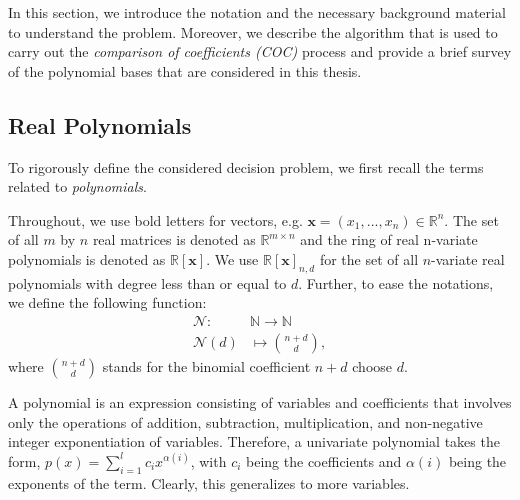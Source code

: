 \documentclass[12pt]{amsart}
\numberwithin{equation}{section}
\theoremstyle{definition}
\numberwithin{thm}{section}
\begin{document}
In this section, we introduce the notation and the necessary background material
to understand the problem. 
Moreover, we describe the algorithm that is used to carry out the \emph{comparison of coefficients (COC)}
process and provide a brief survey of the polynomial bases that are considered in this thesis.


\subsection{Real Polynomials}
\label{Sec:Real Polynomials}
To rigorously define the considered decision problem,
we first recall the terms related to \emph{polynomials}.

Throughout, we use bold letters for vectors, e.g. $\mathbf{x} = (x_1, ..., x_n) \in \mathbb{R}^n$.
The set of all $m$ by $n$ real matrices is denoted as $\mathbb{R}^{m \times n}$ and the ring of real n-variate polynomials is denoted as $\mathbb{R}[\mathbf{x}]$. 
We use $\mathbb{R}[\mathbf{x}]_{n, d}$ for the set of all $n$-variate real polynomials with degree less than or equal to $d$.
Further, to ease the notations, we define the following function: 
\begin{equation*}
     \begin{split}
          \mathcal{N} \colon & \mathbb{N} \to \mathbb{N} \\
          \mathcal{N}(d) & \mapsto { n+d \choose d },
     \end{split}
\end{equation*}
where ${ n+d \choose d }$ stands for the binomial coefficient $n+d$ choose $d$. 

A polynomial is an expression consisting of variables and coefficients that involves only the operations of addition, subtraction, multiplication, and non-negative integer exponentiation of variables.
Therefore, a univariate polynomial takes the form, $p(x) = \sum_{i = 1} ^{l} c_i x^{\alpha(i)}$, with $c_i$ being the coefficients and $\alpha(i)$ being the exponents of the term. 
Clearly, this generalizes to more variables.
\end{document}
